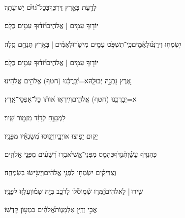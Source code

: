 \documentclass[12pt]{article}
\newcommand{\loc}[1]{\textsuperscript{\locf{#1}}}
\begin{document}
{\loc{ ג}~}‏לָדַ֣עַת בָּאָ֣רֶץ דַּרְכֶּ֑ךָ{\hfill}בְּכׇל־גּ֝וֹיִ֗ם יְשׁוּעָתֶֽךָ׃\par

{\loc{ ד}~}‏יוֹד֖וּךָ עַמִּ֥ים | אֱלֹהִ֑ים{\hfill}י֝וֹד֗וּךָ עַמִּ֥ים כֻּלָּֽם׃\par

{\loc{ ה}~}‏יִ֥שְׂמְח֥וּ וִירַנְּנ֗וּ{\hfill}לְאֻ֫מִּ֥ים\newline\hspace*{.5em}כִּֽי־תִשְׁפֹּ֣ט עַמִּ֣ים מִישֹׁ֑ר{\hfill}וּלְאֻמִּ֓ים |  בָּאָ֖רֶץ תַּנְחֵ֣ם סֶֽלָה׃\par

{\loc{ ו}~}‏יוֹד֖וּךָ עַמִּ֥ים | אֱלֹהִ֑ים{\hfill}י֝וֹד֗וּךָ עַמִּ֥ים כֻּלָּֽם׃\par

{\loc{ ז}~}‏אֶ֭רֶץ נָתְנָ֣ה יְבוּלָ֑הּ{\hfill}א=יְ֝בָרֲכֵ֗נוּ (חטף) אֱלֹהִ֥ים אֱלֹהֵֽינוּ׃\par

{\loc{ ח}~}‏א=יְבָרֲכֵ֥נוּ (חטף) אֱלֹהִ֑ים{\hfill}וְיִֽירְא֥וּ א֝וֹת֗וֹ כׇּל־אַפְסֵי־אָֽרֶץ׃\par\pend
\ledpb
\pstart[\subsection*{\textcolor{red}{פרק סח}}]\label{פרק סח}
{\loc{ א}~}‏לַמְנַצֵּ֥חַ לְדָוִ֗ד מִזְמ֥וֹר שִֽׁיר׃\par

{\loc{ ב}~}‏יָק֣וּם  יָפ֣וּצוּ אוֹיְבָ֑יו{\hfill}וְיָנ֥וּסוּ מְ֝שַׂנְאָ֗יו מִפָּנָֽיו׃\par

{\loc{ ג}~}‏כְּהִנְדֹּ֥ף עָשָׁ֗ן{\hfill}תִּ֫נְדֹּ֥ף\newline\hspace*{.5em}כְּהִמֵּ֣ס  מִפְּנֵי־אֵ֑שׁ{\hfill}יֹאבְד֥וּ רְ֝שָׁעִ֗ים מִפְּנֵ֥י אֱלֹהִֽים׃\par

{\loc{ ד}~}‏וְֽצַדִּיקִ֗ים יִשְׂמְח֣וּ  לִפְנֵ֥י אֱלֹהִ֗ים{\hfill}וְיָשִׂ֥ישׂוּ בְשִׂמְחָֽה׃\par

{\loc{ ה}~}‏שִׁ֤ירוּ |  לֵאלֹהִים֮{\hfill}זַמְּר֢וּ שְׁ֫מ֥וֹ\newline\hspace*{.5em}סֹ֡לּוּ לָרֹכֵ֣ב  בְּיָ֥הּ שְׁמ֗וֹ{\hfill}וְעִלְז֥וּ לְפָנָֽיו׃\par

{\loc{ ו}~}‏אֲבִ֣י  וְדַיַּ֣ן אַלְמָנ֑וֹת{\hfill}אֱ֝לֹהִ֗ים בִּמְע֥וֹן קׇדְשֽׁוֹ׃\par
\end{document}
